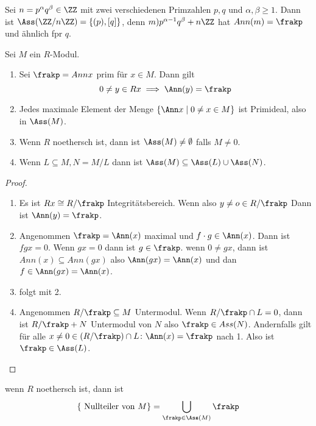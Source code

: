 \begin{Bsp} Sei \(n=p^\alpha q^\beta\in\ZZ\) mit zwei verschiedenen Primzahlen \(p,q\) und \(\alpha,\beta\geq 1\).
	Dann ist \(\Ass(\ZZ/n\ZZ)=\{(p),[q]\}\), denn \(m)p^{\alpha-1}q^\beta+n\ZZ\) hat \(Ann(m)=\frakp\) und ähnlich fpr \(q\).
	
\end{Bsp}
\begin{Satz}\label{Satz:NoetASSNonZero} Sei \(M\) ein \(R\)-Modul.
	\begin{enumerate}
		\item Sei  \(\frakp=Ann x\) prim für \(x\in M\). Dann gilt \[0\neq y\in Rx\implies \Ann(y)=\frakp \]
		\item Jedes maximale Element der Menge \(\{\Ann x \mid 0\neq x\in M \}\) ist Primideal, also in \(\Ass(M)\).
		\item Wenn \(R\) noethersch ist, dann ist \(\Ass(M)\neq \emptyset\) falls \(M\neq 0\).
		\item Wenn \(L\subseteq M, N=M/L\) dann ist \(\Ass(M) \subseteq \Ass(L)\cup \Ass(N) \).
	\end{enumerate} 
\end{Satz}
\begin{proof}
	\begin{enumerate}
		\item[]
		Es ist \(Rx\cong R/\frakp\) Integritätsbereich. Wenn also \(y\neq o\in R/\frakp\) Dann ist \(\Ann(y)=\frakp\).
		\item Angenommen \(\frakp=\Ann(x)\) maximal und \(f\cdot g\in\Ann(x)\).
		Dann ist \(fgx=0\). Wenn \(gx=0\) dann ist \(g\in\frakp\).
		wenn \(0\neq gx\), dann ist \(Ann(x)\subseteq Ann(gx)\) also \(\Ann(gx)=\Ann(x)\) und dan \(f\in\Ann(gx)=\Ann(x)\).
		\item folgt mit 2.
		\item Angenommen \(R/\frakp\subseteq M\) Untermodul. Wenn \( R/\frakp \cap L = 0\), dann ist \(R/\frakp +N \) Untermodul 
		von \(N\) also \(\frakp\in Ass(N)\).
		Andernfalls gilt für alle \(x\neq 0 \in (R/\frakp)\cap L\colon \Ann(x) = \frakp \) nach 1. Also ist \(\frakp\in \Ass(L)\).
		
	\end{enumerate}
\end{proof}
\begin{Kor} wenn \(R\) noethersch ist, dann ist
	\[ \{ \text{ Nullteiler von } M \}=\bigcup_{\frakp\in\Ass(M)}\frakp \]
	
	
\end{Kor}

